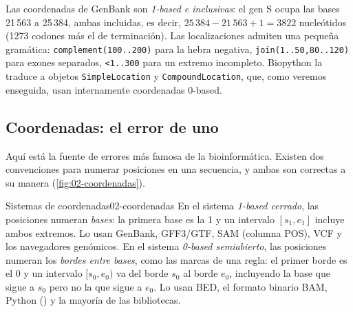 Las coordenadas de GenBank son \emph{1-based e inclusivas}: el gen S ocupa las bases 21\,563 a 25\,384, ambas incluidas, es decir, $25\,384-21\,563+1=3822$ nucleótidos (1273 codones más el de terminación). Las localizaciones admiten una pequeña gramática: \texttt{complement(100..200)} para la hebra negativa, \texttt{join(1..50,80..120)} para exones separados, \texttt{<1..300} para un extremo incompleto. Biopython la traduce a objetos \texttt{SimpleLocation} y \texttt{CompoundLocation}, que, como veremos enseguida, usan internamente coordenadas 0-based.

\subsection{Coordenadas: el error de uno}

Aquí está la fuente de errores más famosa de la bioinformática. Existen dos convenciones para numerar posiciones en una secuencia, y ambas son correctas a su manera (\cref{fig:02-coordenadas}).

\begin{definicion}{Sistemas de coordenadas}{02-coordenadas}
En el sistema \emph{1-based cerrado}, las posiciones numeran \emph{bases}: la primera base es la 1 y un intervalo $[s_1, e_1]$ incluye ambos extremos. Lo usan GenBank, GFF3/GTF, SAM (columna POS), VCF y los navegadores genómicos.
En el sistema \emph{0-based semiabierto}, las posiciones numeran los \emph{bordes entre bases}, como las marcas de una regla: el primer borde es el 0 y un intervalo $[s_0, e_0)$ va del borde $s_0$ al borde $e_0$, incluyendo la base que sigue a $s_0$ pero no la que sigue a $e_0$. Lo usan BED, el formato binario BAM, Python () y la mayoría de las bibliotecas.
\end{definicion}

